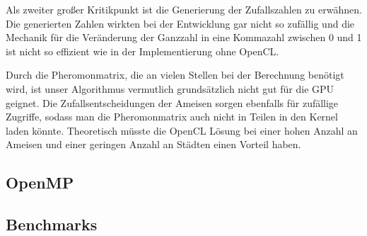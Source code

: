 Als zweiter großer Kritikpunkt ist die Generierung der Zufallszahlen zu erwähnen. 
Die generierten Zahlen wirkten bei der Entwicklung gar nicht so zufällig und die Mechanik für die Veränderung der Ganzzahl in eine Kommazahl zwischen 0 und 1 ist nicht so effizient wie in der Implementierung ohne OpenCL.

Durch die Pheromonmatrix, die an vielen Stellen bei der Berechnung benötigt wird, ist unser Algorithmus vermutlich grundsätzlich nicht gut für die GPU geignet.
Die Zufallsentscheidungen der Ameisen sorgen ebenfalls für zufällige Zugriffe, sodass man die Pheromonmatrix auch nicht in Teilen in den Kernel laden könnte.
Theoretisch müsste die OpenCL Lösung bei einer hohen Anzahl an Ameisen und einer geringen Anzahl an Städten einen Vorteil haben.

\subsection{OpenMP}

\subsection{Benchmarks}
